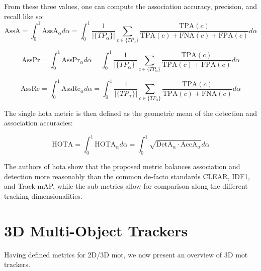 \documentclass[headsepline, hidelinks, footsepline, footinclude=false, oneside, fontsize=11pt, paper=a4, listof=totoc, bibliography=totoc]{scrbook}
\begin{document}
\newpage
From these three values, one can compute the association accuracy, precision, and recall like so:
\begin{equation}
\label{eq:hota-assa}
\text{AssA} = \int_0^1 \text{AssA}_\alpha d\alpha = \int_0^1\frac{1}{|\{TP_\alpha\}|}\sum_{c \in \{TP_\alpha\}} \frac{\text{TPA}(c)}{\text{TPA}(c) + \text{FNA}(c) + \text{FPA}(c)} d\alpha
\end{equation}

\begin{equation}
\label{eq:hota-accpr}
\text{AssPr} = \int_0^1 \text{AssPr}_\alpha d\alpha = \int_0^1\frac{1}{|\{TP_\alpha\}|}\sum_{c \in \{TP_\alpha\}} \frac{\text{TPA}(c)}{\text{TPA}(c) + \text{FPA}(c)} d\alpha
\end{equation}

\begin{equation}
\label{eq:hota-assrc}
\text{AssRe} = \int_0^1\text{AssRe}_\alpha d\alpha = \int_0^1\frac{1}{|\{TP_\alpha\}|}\sum_{c \in \{TP_\alpha\}} \frac{\text{TPA}(c)}{\text{TPA}(c) + \text{FNA}(c)} d\alpha
\end{equation}

The single \gls{hota} metric is then defined as the geometric mean of the detection and association accuracies:

\begin{equation}
\label{eq:hota}
\text{HOTA} = \int_0^1 \text{HOTA}_\alpha d\alpha = \int_0^1 \sqrt{\text{DetA}_\alpha \cdot \text{AccA}_\alpha}d\alpha
\end{equation}

The authors of \gls{hota} show that the proposed metric balances association and detection more reasonably than the common de-facto standards CLEAR, IDF1, and Track-mAP, while the sub metrics allow for comparison along the different tracking dimensionalities.

\section{3D Multi-Object Trackers}
\label{sec:orgced8470}
Having defined metrics for 2D/3D \gls{mot}, we now present an overview of 3D \gls{mot} trackers.
\end{document}

